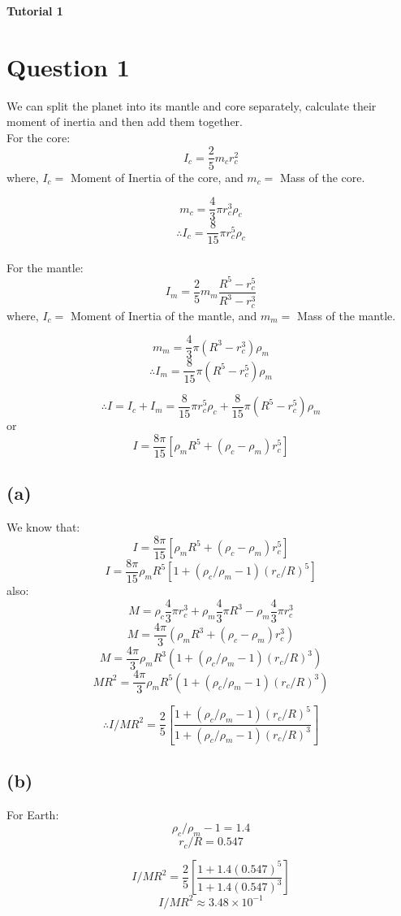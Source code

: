 \documentclass{article}
\begin{document}
\begin{center}
    \begin{LARGE}
        \textbf{Tutorial 1}
    \end{LARGE}
\end{center}

\section*{Question 1}
We can split the planet into its mantle and core separately, calculate their moment of inertia and then add them together.\\
For the core:
$$ I_c = \frac{2}{5}m_c r_c^2 $$
where, $I_c = $ Moment of Inertia of the core, and  $m_c = $ Mass of the core.

$$m_c = \frac{4}{3}\pi r_c^3 \rho_c$$
$$\therefore I_c = \frac{8}{15}\pi r_c^5 \rho_c$$
\\
For the mantle:
$$ I_m = \frac{2}{5}m_m \frac{R^5 - r_c^5}{R^3 - r_c^3}$$
where, $I_c = $ Moment of Inertia of the mantle, and  $m_m = $ Mass of the mantle.

$$m_m = \frac{4}{3}\pi (R^3 - r_c^3) \rho_m$$
$$\therefore I_m = \frac{8}{15}\pi (R^5 - r_c^5) \rho_m$$

$$\therefore I = I_c + I_m = \frac{8}{15}\pi r_c^5 \rho_c + \frac{8}{15}\pi (R^5 - r_c^5) \rho_m$$
or
$$I = \frac{8\pi}{15} \left[ \rho_mR^5 + \left(\rho_c - \rho_m\right)r_c^5\right]$$

\subsection*{(a)}

We know that:
$$I = \frac{8\pi}{15} \left[ \rho_mR^5 + \left(\rho_c - \rho_m\right)r_c^5\right]$$
$$I = \frac{8\pi}{15} \rho_mR^5 \left[ 1 + \left(\rho_c/\rho_m - 1\right)(r_c/R)^5\right]$$
also:
$$M = \rho_c \frac{4}{3} \pi r_c^3 + \rho_m \frac{4}{3} \pi R^3 - \rho_m \frac{4}{3} \pi r_c^3$$
$$M = \frac{4\pi}{3} \left(\rho_m R^3 + (\rho_c - \rho_m)r_c^3 \right)$$
$$M = \frac{4\pi}{3} \rho_m R^3 \left(1 + \left(\rho_c/\rho_m - 1\right)(r_c/R)^3 \right)$$
$$MR^2 = \frac{4\pi}{3} \rho_m R^5 \left(1 + \left(\rho_c/\rho_m - 1\right)(r_c/R)^3 \right)$$

$$\therefore I/MR^2 = \frac{2}{5} \left[\frac{1 + \left(\rho_c/\rho_m - 1\right)(r_c/R)^5}{1 + \left(\rho_c/\rho_m - 1\right)(r_c/R)^3}\right]$$

\subsection*{(b)}

For Earth:
$$\rho_c/\rho_m - 1 = 1.4 $$
$$r_c/R = 0.547$$

$$I/MR^2 = \frac{2}{5} \left[\frac{1 + 1.4(0.547)^5}{1 + 1.4(0.547)^3}\right]$$
$$I/MR^2 \approx 3.48\times10^{-1}$$
\end{document}

